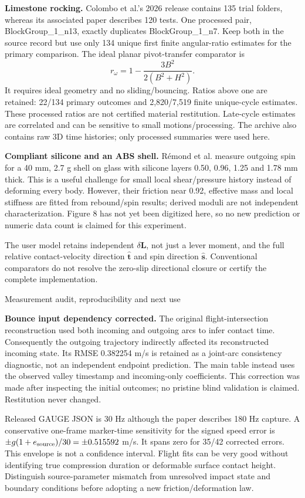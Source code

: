 \documentclass[10pt,a4paper]{article}
\begin{document}
\textbf{Limestone rocking.} Colombo et al.'s 2026 release contains 135 trial
folders, whereas its associated paper describes 120 tests. One processed pair,
BlockGroup\_1\_n13, exactly duplicates BlockGroup\_1\_n7. Keep both in the source
record but use only 134 unique first finite angular-ratio estimates for the primary
comparison. The ideal planar pivot-transfer comparator is
\[
 r_\omega=1-\frac{3B^2}{2(B^2+H^2)}.
\]
It requires ideal geometry and no sliding/bouncing. Ratios above one are retained:
22/134 primary outcomes and 2,820/7,519 finite unique-cycle estimates. These
processed ratios are not certified material restitution. Late-cycle estimates
are correlated and can be sensitive to small motions/processing. The archive also
contains raw 3D time histories; only processed summaries were used here.

\textbf{Compliant silicone and an ABS shell.} R\'emond et al. measure outgoing
spin for a 40 mm, 2.7 g shell on glass with silicone layers 0.50, 0.96, 1.25 and
1.78 mm thick. This is a useful challenge for small local shear/pressure history
instead of deforming every body. However, their friction near 0.92, effective mass
and local stiffness are fitted from rebound/spin results; derived moduli are not
independent characterization. Figure 8 has not yet been digitized here, so no new
prediction or numeric data count is claimed for this experiment.

The user model retains independent $\delta\boldsymbol L$, not just a lever moment,
and the full relative contact-velocity direction $\hat{\boldsymbol t}$ and spin
direction $\hat{\boldsymbol s}$. Conventional comparators do not resolve the
zero-slip directional closure or certify the complete implementation.

\newpage
\begin{center}{\large Measurement audit, reproducibility and next use}\end{center}
\textbf{Bounce input dependency corrected.} The original flight-intersection
reconstruction used both incoming and outgoing arcs to infer contact time.
Consequently the outgoing trajectory indirectly affected its reconstructed
incoming state. Its RMSE 0.382254 m/s is retained as a joint-arc consistency
diagnostic, not an independent endpoint prediction. The main table instead uses
the observed valley timestamp and incoming-only coefficients. This correction
was made after inspecting the initial outcomes; no pristine blind validation
is claimed. Restitution never changed.

Released GAUGE JSON is 30 Hz although the paper describes 180 Hz capture. A
conservative one-frame marker-time sensitivity for the signed speed error is
$\pm g(1+e_{\rm source})/30=\pm0.515592$ m/s. It spans zero for 35/42 corrected
errors. This envelope is not a confidence interval. Flight fits can be very good
without identifying true compression duration or deformable surface contact
height. Distinguish source-parameter mismatch from unresolved impact state and
boundary conditions before adopting a new friction/deformation law.
\end{document}
